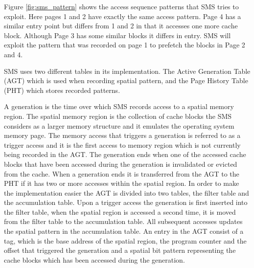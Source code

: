 Figure \ref{fig:sms_pattern} shows the access sequence patterns that SMS tries to exploit. Here pages 1 and 2 have exactly the same access pattern. Page 4 has a similar entry point but differs from 1 and 2 in that it accesses one more cache block. Although Page 3 has some similar blocks it differs in entry. SMS will exploit the pattern that was recorded on page 1 to prefetch the blocks in Page 2 and 4.
\newline

SMS uses two different tables in its implementation. The Active
Generation Table (AGT) which is used when recording spatial pattern,
and the Page History Table (PHT) which stores recorded patterns. 

A generation is the time over which SMS records access to a spatial
memory region. The spatial memory region is the collection of cache
blocks the SMS considers as a larger memory structure and it emulates
the operating system memory page. The memory access that triggers a
generation is referred to as a trigger access and it is the first
access to memory region which is not currently being recorded in the
AGT. The generation ends when one of the accessed cache blocks that
have been accessed during the generation is invalidated or evicted
from the cache.  When a generation ends it is transferred from the AGT
to the PHT if it has two or more accesses within the spatial
region. In order to make the implementation easier the AGT is divided
into two tables, the filter table and the accumulation table.  Upon a
trigger access the generation is first inserted into the filter table,
when the spatial region is accessed a second time, it is moved from
the filter table to the accumulation table. All subsequent accesses
updates the spatial pattern in the accumulation table.  An entry in
the AGT consist of a tag, which is the base address of the spatial
region, the program counter and the offset that triggered the
generation and a spatial bit pattern representing the cache blocks which has been
accessed during the generation. 

